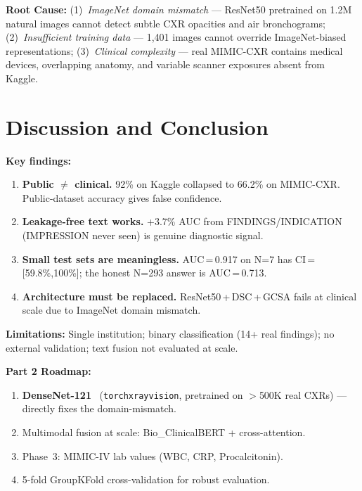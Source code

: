 \documentclass{article}
\begin{document}
\textbf{Root Cause:}
(1)~\textit{ImageNet domain mismatch} --- ResNet50 pretrained on 1.2M natural
images cannot detect subtle CXR opacities and air bronchograms;
(2)~\textit{Insufficient training data} --- 1,401 images cannot override
ImageNet-biased representations;
(3)~\textit{Clinical complexity} --- real MIMIC-CXR contains medical devices,
overlapping anatomy, and variable scanner exposures absent from Kaggle.

\section{Discussion and Conclusion}

\textbf{Key findings:}
\begin{enumerate}[noitemsep,leftmargin=*,topsep=2pt]
  \item \textbf{Public $\neq$ clinical.} 92\% on Kaggle collapsed to 66.2\% on
        MIMIC-CXR. Public-dataset accuracy gives false confidence.
  \item \textbf{Leakage-free text works.} +3.7\% AUC from FINDINGS/INDICATION
        (IMPRESSION never seen) is genuine diagnostic signal.
  \item \textbf{Small test sets are meaningless.} AUC\,=\,0.917 on N=7 has
        CI\,=\,[59.8\%,100\%]; the honest N=293 answer is AUC\,=\,0.713.
  \item \textbf{Architecture must be replaced.} ResNet50\,+\,DSC\,+\,GCSA fails
        at clinical scale due to ImageNet domain mismatch.
\end{enumerate}

\textbf{Limitations:} Single institution; binary classification (14+ real findings);
no external validation; text fusion not evaluated at scale.

\textbf{Part 2 Roadmap:}
\begin{enumerate}[noitemsep,leftmargin=*,topsep=2pt]
  \item \textbf{DenseNet-121}~\cite{huang2017densenet} (\texttt{torchxrayvision},
        pretrained on $>$500K real CXRs) --- directly fixes the domain-mismatch.
  \item Multimodal fusion at scale: Bio\_ClinicalBERT + cross-attention.
  \item Phase~3: MIMIC-IV lab values (WBC, CRP, Procalcitonin).
  \item 5-fold GroupKFold cross-validation for robust evaluation.
\end{enumerate}
\end{document}
